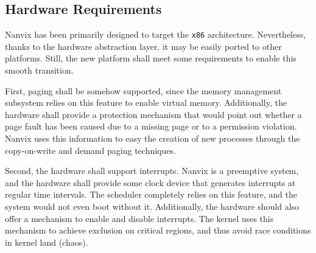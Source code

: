 \subsection{Hardware Requirements}
\label{section: hardware requirements}

	Nanvix has been primarily designed to target the \texttt{x86}
	architecture. Nevertheless, thanks to the hardware abstraction layer, it
	may be easily ported to other platforms. Still, the new platform shall
	meet some requirements to enable this smooth transition.

	First, paging shall be somehow supported, since the memory
	management subsystem relies on this feature to enable virtual
	memory. Additionally, the hardware shall provide a protection
	mechanism that would point out whether a page fault has been caused
	due to a missing page or to a permission violation. Nanvix uses this
	information to easy the creation of new processes through the
	copy-on-write and demand paging techniques.

	Second, the hardware shall support interrupts. Nanvix is a
	preemptive system, and the hardware shall provide some clock device
	that generates interrupts at regular time intervals. The scheduler
	completely relies on this feature, and the system would not even
	boot without it. Additionally, the hardware should also offer a
	mechanism to enable and disable interrupts. The kernel uses this
	mechanism to achieve exclusion on critical regions, and thus avoid
	race conditions in kernel land (chaos).

